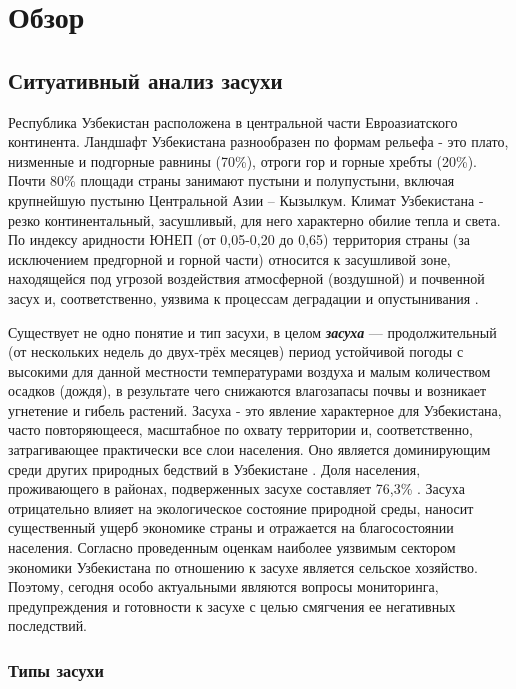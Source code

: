 \chapter{Обзор} \label{chapt1}

\section{Ситуативный анализ засухи} \label{sect1_1}


Республика Узбекистан расположена в центральной части Евроазиатского континента. Ландшафт Узбекистана разнообразен по формам рельефа - это плато, низменные и подгорные равнины (70\%), отроги гор и горные хребты (20\%). Почти 80\% площади страны занимают пустыни и полупустыни, включая крупнейшую пустыню Центральной Азии – Кызылкум. 
Климат Узбекистана - резко континентальный, засушливый, для него характерно обилие тепла и света. По индексу аридности ЮНЕП (от 0,05-0,20 до 0,65) территория страны (за исключением предгорной и горной части) относится к засушливой зоне, находящейся под угрозой воздействия атмосферной (воздушной) и почвенной засух и, соответственно, уязвима к процессам деградации и опустынивания \cite{Zasuha2013}.

Существует не одно понятие и тип засухи, в целом \textit{\textbf{засуха}} — продолжительный (от нескольких недель до двух-трёх месяцев) период устойчивой погоды с высокими для данной местности температурами воздуха и малым количеством осадков (дождя), в результате чего снижаются влагозапасы почвы и возникает угнетение и гибель растений.
Засуха - это явление характерное для Узбекистана, часто повторяющееся, масштабное по охвату территории и, соответственно, затрагивающее практически все слои населения. Оно является доминирующим среди других природных бедствий в Узбекистане \cite{Agalceva2012, Zasuha2005, Chub2007}. Доля населения, проживающего в районах, подверженных засухе составляет 76,3\% \cite{Zasuha2013}. Засуха отрицательно влияет на экологическое состояние природной среды, наносит существенный ущерб экономике страны и отражается на благосостоянии населения. Согласно проведенным оценкам наиболее уязвимым сектором экономики Узбекистана по отношению к засухе является сельское хозяйство. Поэтому, сегодня особо актуальными являются вопросы мониторинга, предупреждения и готовности к засухе с целью смягчения ее негативных последствий. 

\subsection{Типы засухи}

